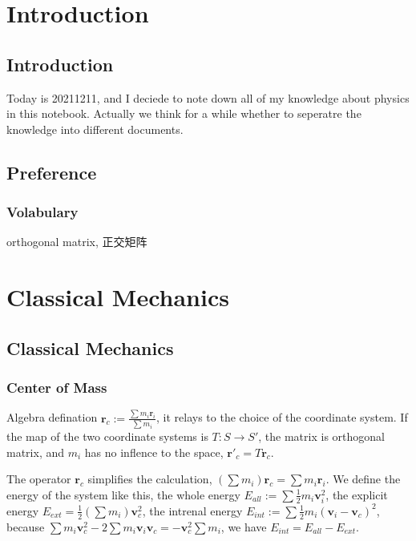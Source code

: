 \documentclass[UTF8]{book}
\begin{document}
\chapter{Introduction}

\section{Introduction}
Today is 20211211, and I deciede to note down all of my knowledge about physics in this notebook. Actually we think for a while whether to seperatre the knowledge into different documents.

\section{Preference}
\subsection{Volabulary}
orthogonal matrix, 正交矩阵
 

\chapter{Classical Mechanics}

\section{Classical Mechanics}


\subsection{Center of Mass}

Algebra defination $\boldsymbol r_c := \frac{\sum m_i \boldsymbol r_i}{\sum m_i} $, it relays to the choice of the coordinate system. If the map of the two coordinate systems is $T: S \rightarrow S'$, the matrix is orthogonal matrix, and $m_i$ has no inflence to the space, $\boldsymbol r'_c = T\boldsymbol r_c$.

The operator $\boldsymbol r_c $ simplifies the calculation, $(\sum m_i)\boldsymbol r_c = \sum m_i \boldsymbol r_i$.
We define the energy of the system like this, the whole energy $E_{all} := \sum \frac{1}{2} m_i \boldsymbol {v}_i^2$, the explicit energy $E_{ext} = \frac{1}{2} (\sum  m_i) \boldsymbol {v}_c^2$, the intrenal energy $E_{int} := \sum \frac{1}{2} m_i (\boldsymbol {v}_i- \boldsymbol {v}_c)^2$, because $\sum m_i \boldsymbol{v}_c^2-2\sum m_i \boldsymbol {v}_i \boldsymbol{v}_c = -\boldsymbol{v}_c^2 \sum m_i$, we have $E_{int} = E_{all} - E_{ext}$.
\end{document}

